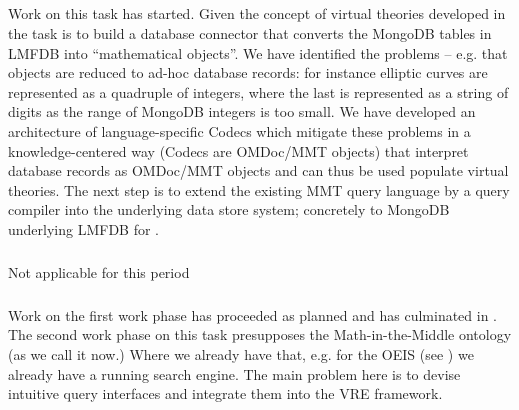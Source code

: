 \subparagraph{}
\label{dksbases@data-LMFDB}

Work on this task has started. Given the concept of virtual theories developed in  the task is to build a database connector that converts the MongoDB tables in LMFDB into ``mathematical objects''.
We have identified the problems -- e.g. that objects are reduced to ad-hoc database records: for instance elliptic curves are represented as a quadruple of integers, where the last is represented as a string of digits as the range of MongoDB integers is too small.
We have developed an architecture of language-specific Codecs which mitigate these problems in a knowledge-centered way (Codecs are OMDoc/MMT objects) that interpret database records as OMDoc/MMT objects and can thus be used populate virtual theories.
The next step is to extend the existing MMT query language by a query compiler into the underlying data store system; concretely to MongoDB underlying LMFDB for .
\medskip

\subparagraph{}
\label{dksbases@data-memo}
Not applicable for this period
\medskip

\subparagraph{}

Work on the first work phase has proceeded as planned and has culminated in .
The second work phase on this task presupposes the Math-in-the-Middle ontology (as we call it now.)
Where we already have that, e.g. for the OEIS (see ) we already have a running search engine.
The main problem here is to devise intuitive query interfaces and integrate them into the \pn VRE framework.


